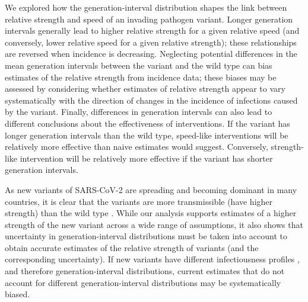 \documentclass[12pt]{article}
\begin{document}
We explored how the generation-interval distribution shapes the link between relative strength and speed of an invading pathogen variant.
Longer generation intervals generally lead to higher relative strength for a given relative speed (and conversely, lower relative speed for a given relative strength); these relationships are reversed when incidence is decreasing.
Neglecting potential differences in the mean generation intervals between the variant and the wild type can bias estimates of the relative strength from incidence data;
these biases may be assessed by considering whether estimates of relative strength appear to vary systematically with the direction of changes in the incidence of infections caused by the variant.
Finally, differences in generation intervals can also lead to different conclusions about the effectiveness of interventions.
If the variant has longer generation intervals than the wild type, speed-like interventions will be relatively more effective than naive estimates would suggest. 
Conversely, strength-like intervention will be relatively more effective if the variant has shorter generation intervals.

As new variants of SARS-CoV-2 are spreading and becoming dominant in many countries, it is clear that the variants are more transmissible (have higher strength) than the wild type \citep{switzerland2021variant, davies2021estimated, di2021impact, graham2021changes, leung2021early, volz2021transmission,zhao2021}.
While our analysis supports estimates of a higher strength of the new variant across a wide range of assumptions, it also shows that uncertainty in generation-interval distributions must be taken into account to obtain accurate estimates of the relative strength of variants (and the corresponding uncertainty).
If new variants have different infectiousness profiles \citep{kissler2021densely,li2021viral,zhang2021transmission}, and therefore generation-interval distributions, current estimates that do not account for different generation-interval distributions may be systematically biased.
\end{document}
